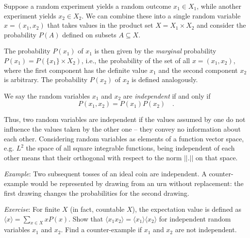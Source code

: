 \documentclass{notebook}
\newcommand{\Example}{\textit{Example}}
\newcommand{\Exercise}{\textit{Exercise}}
\begin{document}
\begin{theorem}
	Suppose a random experiment yields a random outcome $x_1\in X_1$, while another experiment yields $x_2\in X_2$. We can combine these into a single random variable $x=(x_1,x_2)$ that takes values in the product set $X=X_1 \times X_2$ and consider the probability $P(A)$ defined on subsets $A\subseteq X$. 
	
	The probability $P(x_1)$ of $x_1$ is then given by the \textit{marginal} probability $P(x_1)=P(\{x_1\}\times X_2)$, i.e.,  the probability of the set of all $x=(x_1,x_2)$, where the first component has the definite value $x_1$ and the second component $x_2$ is arbitrary. The probability $P(x_2)$ of $x_2$ is defined analogously.  
	
	We say the random variables $x_1$ and $x_2$ are \textit{independent} if and only if
	\begin{equation}
	P(x_1,x_2) = P(x_1)P(x_2) \quad. 
	\end{equation}
\end{theorem}


Thus, two random variables are independent if the values assumed by one do not influence the values taken by the other one – they convey no information about each other. Considering random variables as elements of a function vector space, e.g. $L^2$ the space of all square integrable functions, being independent of each other means that their orthogonal with respect to the norm $||.||$ on that space. 


\Example: 
Two subsequent tosses of an ideal coin are independent.
A counter-example would be represented by drawing from an urn without replacement:
the first drawing changes the probabilities for the second drawing.

\Exercise:
For finite $X$ (in fact, countable $X$), 
the expectation value is defined as
$\langle x\rangle=\sum_{x\in X} x P(x)$.
Show that 
$\langle x_1 x_2 \rangle = \langle x_1 \rangle \langle x_2 \rangle$
for independent random variables $x_1$ and $x_2$.
Find a counter-example if $x_1$ and $x_2$ are not independent.
\end{document}
